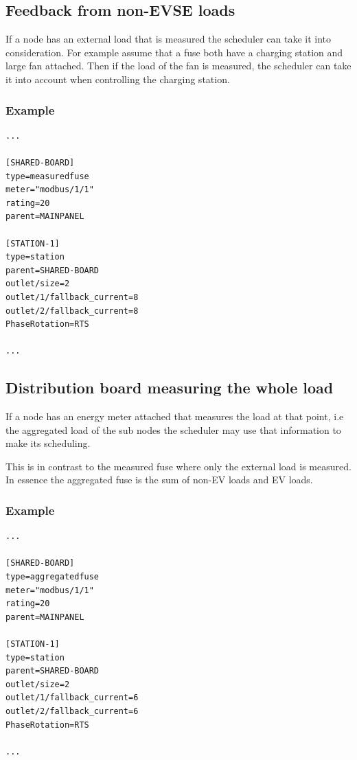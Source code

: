 \documentclass[10pt,a4paper,oneside,headings=big,headsepline]{scrreprt}
\begin{document}
\subsection{Feedback from non-EVSE loads}
\label{sec:feedback-from-non}

If a node has an external load that is measured the scheduler can take
it into consideration. For example assume that a fuse both have a
charging station and large fan attached. Then if the load of the fan
is measured, the scheduler can take it into account when controlling the
charging station.

\subsubsection{Example}

\begin{verbatim}
...

[SHARED-BOARD]
type=measuredfuse
meter="modbus/1/1"
rating=20
parent=MAINPANEL

[STATION-1]
type=station
parent=SHARED-BOARD
outlet/size=2
outlet/1/fallback_current=8
outlet/2/fallback_current=8
PhaseRotation=RTS

...
\end{verbatim}


\subsection{Distribution board measuring the whole load}
\label{sec:meas-distr-board}

If a node has an energy meter attached that measures the load at that
point, i.e the aggregated load of the sub nodes the scheduler may use
that information to make its scheduling.

This is in contrast to the measured fuse where only the external load
is measured. In essence the aggregated fuse is the sum of non-EV loads
and EV loads.

\subsubsection{Example}

\begin{verbatim}
...

[SHARED-BOARD]
type=aggregatedfuse
meter="modbus/1/1"
rating=20
parent=MAINPANEL

[STATION-1]
type=station
parent=SHARED-BOARD
outlet/size=2
outlet/1/fallback_current=6
outlet/2/fallback_current=6
PhaseRotation=RTS

...
\end{verbatim}
\end{document}
